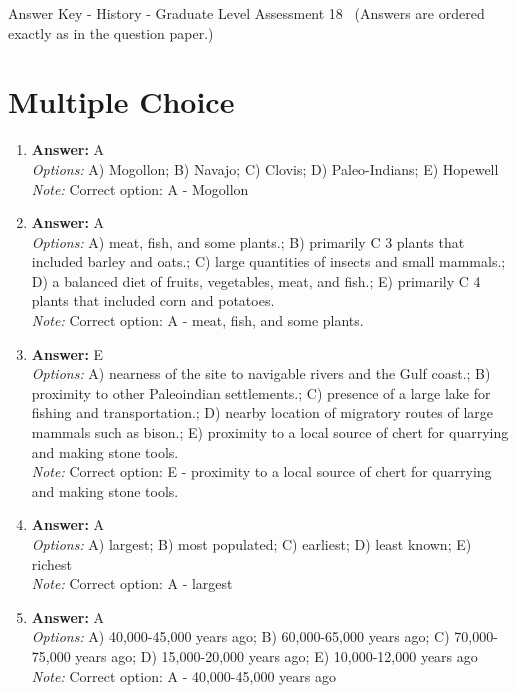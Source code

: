 \documentclass[12pt]{article}
\begin{document}
\begin{center}
Answer Key - History - Graduate Level Assessment 18 \
\small (Answers are ordered exactly as in the question paper.)
\end{center}

\section*{Multiple Choice}
\begin{enumerate}[label=\arabic*.]
\item \textbf{Answer:} A
\\ \textit{Options:} A) Mogollon; B) Navajo; C) Clovis; D) Paleo-Indians; E) Hopewell
\\ \textit{Note:} Correct option: A - Mogollon
\item \textbf{Answer:} A
\\ \textit{Options:} A) meat, fish, and some plants.; B) primarily C 3 plants that included barley and oats.; C) large quantities of insects and small mammals.; D) a balanced diet of fruits, vegetables, meat, and fish.; E) primarily C 4 plants that included corn and potatoes.
\\ \textit{Note:} Correct option: A - meat, fish, and some plants.
\item \textbf{Answer:} E
\\ \textit{Options:} A) nearness of the site to navigable rivers and the Gulf coast.; B) proximity to other Paleoindian settlements.; C) presence of a large lake for fishing and transportation.; D) nearby location of migratory routes of large mammals such as bison.; E) proximity to a local source of chert for quarrying and making stone tools.
\\ \textit{Note:} Correct option: E - proximity to a local source of chert for quarrying and making stone tools.
\item \textbf{Answer:} A
\\ \textit{Options:} A) largest; B) most populated; C) earliest; D) least known; E) richest
\\ \textit{Note:} Correct option: A - largest
\item \textbf{Answer:} A
\\ \textit{Options:} A) 40,000-45,000 years ago; B) 60,000-65,000 years ago; C) 70,000-75,000 years ago; D) 15,000-20,000 years ago; E) 10,000-12,000 years ago
\\ \textit{Note:} Correct option: A - 40,000-45,000 years ago
\end{enumerate}
\end{document}
